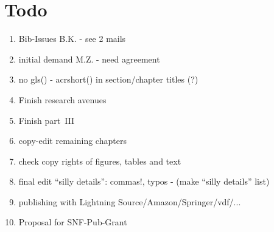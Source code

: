 \section*{Todo}

\begin{enumerate}\styleEnumerate

\item Bib-Issues B.K. - see 2 mails

\item initial demand M.Z. - need agreement

\item no gls() - acrshort() in section/chapter titles (?)

\item Finish research avenues

\item Finish part~III

\item copy-edit remaining chapters

\item check copy rights of figures, tables and text

\item final edit ``silly details'': commas!, typos - (make ``silly details'' list)

\item publishing with Lightning Source/Amazon/Springer/vdf/...

\item Proposal for SNF-Pub-Grant







\end{enumerate}

